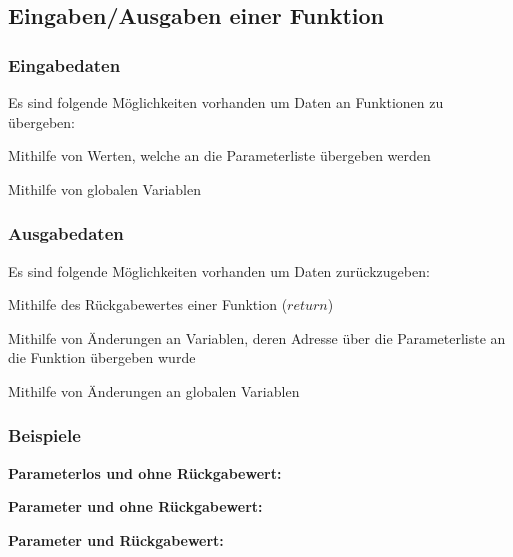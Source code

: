 	\subsection{Eingaben/Ausgaben einer Funktion }
		\begin{minipage}[t]{8.5 cm}
			\subsubsection{Eingabedaten}
				Es sind folgende Möglichkeiten vorhanden um Daten an Funktionen zu übergeben:
				\begin{compactitem}
					\item Mithilfe von Werten, welche an die Parameterliste übergeben werden
					\item Mithilfe von globalen Variablen
				\end{compactitem}
		\end{minipage}
		\hspace*{0.5cm}
		\begin{minipage}[t]{8.5 cm}
			\subsubsection{Ausgabedaten}
				Es sind folgende Möglichkeiten vorhanden um Daten zurückzugeben:
				\begin{compactitem}
					\item Mithilfe des Rückgabewertes einer Funktion ($return$)
					\item Mithilfe von Änderungen an Variablen, deren Adresse über die Parameterliste an die Funktion übergeben wurde
					\item Mithilfe von Änderungen an globalen Variablen
				\end{compactitem}	
		\end{minipage}	
		
		\subsubsection{Beispiele}
			\begin{minipage}[t]{8.5 cm}
				\textbf{Parameterlos und ohne Rückgabewert:}
				
				
				\textbf{Parameter und ohne Rückgabewert:}
				
			\end{minipage}
			\hspace*{0.5cm}
			\begin{minipage}[t]{8.5 cm}
				\textbf{Parameter und Rückgabewert:}
				
			\end{minipage}

